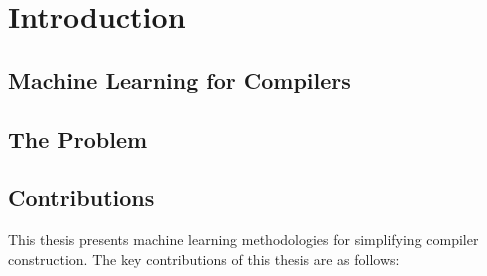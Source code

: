 \chapter{Introduction}

\section{Machine Learning for Compilers}

\section{The Problem}


\section{Contributions}

This thesis presents machine learning methodologies for simplifying compiler construction. The key contributions of this thesis are as follows:

